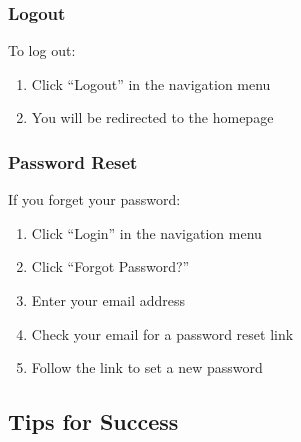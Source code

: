 \documentclass[letterpaper,10pt,english]{sphinxmanual}
\begin{document}
\subsubsection{Logout}
\label{\detokenize{user_guide:logout}}
\sphinxAtStartPar
To log out:
\begin{enumerate}
%
\item {} 
\sphinxAtStartPar
Click “Logout” in the navigation menu

\item {} 
\sphinxAtStartPar
You will be redirected to the homepage

\end{enumerate}


\subsubsection{Password Reset}
\label{\detokenize{user_guide:password-reset}}
\sphinxAtStartPar
If you forget your password:
\begin{enumerate}
%
\item {} 
\sphinxAtStartPar
Click “Login” in the navigation menu

\item {} 
\sphinxAtStartPar
Click “Forgot Password?”

\item {} 
\sphinxAtStartPar
Enter your email address

\item {} 
\sphinxAtStartPar
Check your email for a password reset link

\item {} 
\sphinxAtStartPar
Follow the link to set a new password

\end{enumerate}


\subsection{Tips for Success}
\label{\detokenize{user_guide:tips-for-success}}
\end{document}
